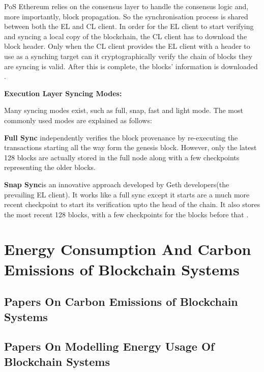 PoS Ethereum relies on the consensus layer to handle the consensus logic and, more importantly, block propagation. So the synchronisation process is shared between both the EL and CL client. In order for the EL client to start verifying and syncing a local copy of the blockchain, the CL client has to download the block header. Only when the CL client provides the EL client with a header to use as a synching target can it cryptographically verify the chain of blocks they are syncing is valid. After this is complete, the blocks' information is downloaded \cite{2022DeveloperGo-ethereum}.

\textbf{Execution Layer Syncing Modes: } 

Many syncing modes exist, such as full, snap, fast and light mode. The most commonly used modes are explained as follows: 

\textbf{Full Sync } independently verifies the block provenance by re-executing the transactions starting all the way form the genesis block. However, only the latest 128 blocks are actually stored in the full node along with a few checkpoints representing the older blocks. 

\textbf{Snap Sync}is an innovative approach developed by Geth developers(the prevailing EL client). It works like a full sync except it starts are a much more recent checkpoint to start its verification upto the head of the chain. It also stores the most recent 128 blocks, with a few checkpoints for the blocks before that \cite{2022DeveloperGo-ethereum}.





\section{Energy Consumption And Carbon Emissions of Blockchain Systems}




\subsection{Papers On Carbon Emissions of Blockchain Systems}



\subsection{Papers On Modelling Energy Usage Of Blockchain Systems}


